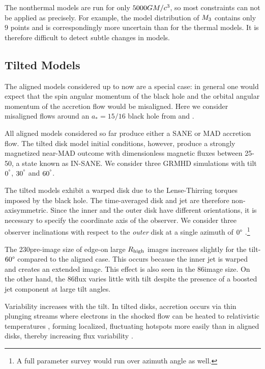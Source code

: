 

The nonthermal models are run for only $5000GM/c^3$, so most  constraints can not be applied as precisely.
For example, the model distribution of $M_{3}$ contains only $9$ points and is correspondingly more uncertain than for the thermal models.
It is therefore difficult to detect subtle changes in models.

\subsection{Tilted Models}

The aligned models considered up to now are a special case: in general one would expect that the spin angular momentum of the black hole and the orbital angular momentum of the accretion flow would be misaligned.
Here we consider misaligned flows around an $a_*=15/16$ black hole from \citet{Liska2018} and \citet{Chatterjee2020}.

All aligned models considered so far produce either a SANE or MAD accretion flow.
The tilted disk model initial conditions, however, produce a strongly magnetized near-MAD outcome with dimensionless magnetic fluxes between 25-50, a state known as IN-SANE.
We consider three GRMHD simulations with tilt $0^{\degree}$, $30^{\degree}$ and $60^{\degree}$.

The tilted models exhibit a warped disk due to the Lense-Thirring torques imposed by the black hole.
The time-averaged disk and jet are therefore non-axisymmetric.
Since the inner and the outer disk have different orientations, it is necessary to specify the coordinate axis of the observer.
We consider three  observer inclinations with respect to the {\em outer} disk at a single azimuth of $0\degree$ \citep[for more details, see][]{Chatterjee2020}.\footnote{A full parameter survey would run over azimuth angle as well.}

The 230\GHz pre-image size of edge-on large $R_\mathrm{high}$ images increases slightly for the tilt-$60\degree$ compared to the aligned case.
This occurs because the inner jet is warped and creates an extended image.
This effect is also seen in the 86\GHz image size.
On the other hand, the 86\GHz flux varies little with tilt despite the presence of a boosted jet component at large tilt angles.

Variability increases with the tilt.
In tilted disks, accretion occurs via thin plunging streams \citep[e.g.,][]{Fragile2007} where electrons in the shocked flow can be heated to relativistic temperatures \citep[e.g.,][]{Dexter2013, 2014ApJ...780...81G, White2019}, forming localized, fluctuating hotspots more easily than in aligned disks, thereby increasing flux variability \citep{Chatterjee2020, 2021arXiv210412896W}.

